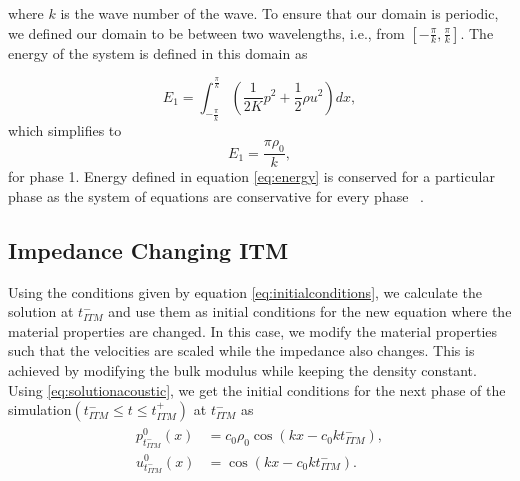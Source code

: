 where $k$ is the wave number of the wave. To ensure that our domain is periodic, we defined our domain to be between two wavelengths, i.e., from 
$\left[-\frac{\pi}{k}, \frac{\pi}{k}\right]$. The energy of the system is defined in this domain as ~\parencite{Kopriva2021}

\begin{equation}
     E_1 = \int_{-\frac{\pi}{k}}^{\frac{\pi}{k}} \left(\frac{1}{2K}p^2 + \frac{1}{2}\rho u^2\right) dx,
    \label{eq:energy}
\end{equation}
which simplifies to
\begin{equation}
    E_1 = \frac{\pi\rho_0}{k},
\end{equation}
for phase 1. Energy defined in equation \ref{eq:energy} is conserved for a particular phase as the system of equations are conservative for every phase ~\parencite{Kopriva2021}. 

\subsection{\texorpdfstring{Impedance Changing \ac{ITM}}{Impedance Changing ITM}}\label{section:impedancechangingITM}
Using the conditions given by equation \ref{eq:initialconditions}, we calculate the solution at $t_{ITM}^-$ and use them as initial conditions for the new equation where the material properties are changed.
In this case, we modify the material properties such that the velocities are scaled while the impedance also changes. This is achieved by modifying the bulk modulus while keeping the density constant. Using \ref{eq:solutionacoustic}, we get the initial conditions for the next phase of the simulation$\left(t_{ITM}^- \leq t \leq t_{ITM}^+ \right)$ at $t_{ITM}^-$ as
\begin{align}
    \begin{split}
        p^0_{t_{ITM}^-}\left(x\right) &= c_0 \rho_0 \cos\left(kx - c_0kt_{ITM}^-\right), \\
        u^0_{t_{ITM}^-}\left(x\right) &= \cos\left(kx - c_0kt_{ITM}^-\right) .
    \end{split}
\end{align}

